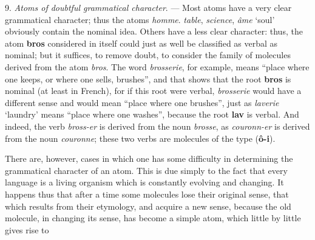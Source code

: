 \begin{sloppypar}
{{      9. \emph{Atoms of doubtful grammatical character}. --- Most
      atoms have a very clear grammatical character; thus the atoms
      \emph{homme}. \emph{table}, \emph{science}, \emph{âme} `soul'
      obviously contain the nominal idea. Others have a less clear
      character: thus, the atom \textbf{bros} considered in itself
      could just as well be classified as verbal as nominal; but it
      suffices, to remove doubt, to consider the family of molecules
      derived from the atom \emph{bros}. The word \emph{brosserie},
      for example, means ``place where one keeps, or where one sells,
      brushes'', and that shows that the root \textbf{bros} is nominal
      (at least in French), for if this root were verbal,
      \emph{brosserie} would have a different sense and would mean
      ``place where one brushes'', just as \emph{laverie} `laundry'
      means ``place where one washes'', because the root \textbf{lav}
      is verbal. And indeed, the verb \emph{bross-er} is derived from
      the noun \emph{brosse}, as \emph{couronn-er} is derived from the
      noun \emph{couronne}; these two verbs are molecules of the type
      (\textbf{ô-i}).

      There are, however, cases in which one has some difficulty in
      determining the grammatical character of an atom. This is due
      simply to the fact that every language is a living organism
      which is constantly evolving and changing.  It happens thus that
      after a time some molecules lose their original sense, that
      which results from their etymology, and acquire a new sense,
      because the old molecule, in changing its sense, has become a
      simple atom, which little by little gives rise to



    }

  }

\end{sloppypar}
